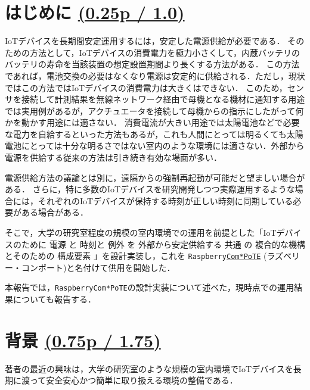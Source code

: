 \section{はじめに \small{\underline{(0.25p / 1.0)}}}
\label{sec:01introduction}

IoTデバイスを長期間安定運用するには，安定した電源供給が必要である．
そのための方法として，IoTデバイスの消費電力を極力小さくして，内蔵バッテリのバッテリの寿命を当該装置の想定設置期間より長くする方法がある．
この方法であれば，電池交換の必要はなくなり電源は安定的に供給される．ただし，現状ではこの方法ではIoTデバイスの消費電力は大きくはできない．
このため，センサを接続して計測結果を無線ネットワーク経由で母機となる機材に通知する用途では実用例があるが，アクチュエータを接続して母機からの指示にしたがって何かを動かす用途には適さない．
消費電流が大きい用途では太陽電池などで必要な電力を自給するといった方法もあるが，これも人間にとっては明るくても太陽電池にとっては十分な明るさではない室内のような環境には適さない．外部から電源を供給する従来の方法は引き続き有効な場面が多い．

電源供給方法の議論とは別に，遠隔からの強制再起動が可能だと望ましい場合がある．
さらに，特に多数のIoTデバイスを研究開発しつつ実際運用するような場合には，それぞれのIoTデバイスが保持する時刻が正しい時刻に同期している必要がある場合がある．

そこで，大学の研究室程度の規模の室内環境での運用を前提とした「IoTデバイスのために
電源 と
時刻と
例外 を
外部から安定供給する
共通 の
複合的な機構とそのための
構成要素
」を設計実装し，これを
{\tt Raspberry\underline{Com*PoTE}}
(ラズベリー・コンポート)と名付けて供用を開始した．

本報告では，{\tt Raspberry\-Com*PoTE}の設計実装について述べた，現時点での運用結果についても報告する．

\section{背景 \small{\underline{(0.75p / 1.75)}}}
\label{sec:02background}

著者の最近の興味は，大学の研究室のような規模の室内環境でIoTデバイスを長期に渡って安全安心かつ簡単に取り扱える環境の整備である．

